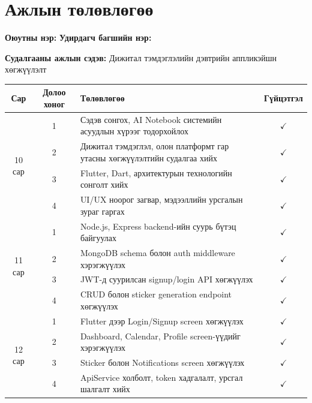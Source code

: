 \chapter*{Ажлын төлөвлөгөө}
\label{ch:plan}

\noindent\textbf{Оюутны нэр:} \authorShort \hfill \textbf{Удирдагч багшийн нэр:} \supervisorname

\noindent\textbf{Судалгааны ажлын сэдэв:} Дижитал тэмдэглэлийн дэвтрийн аппликэйшн хөгжүүлэлт

\vspace{0.3cm}

\begin{table}[H]
\centering
\small
\setlength{\tabcolsep}{4pt}
\renewcommand{\arraystretch}{1.0}

\begin{tabular}{|c|c|p{8.4cm}|c|}
\hline
\textbf{Сар} & \textbf{Долоо хоног} & \textbf{Төлөвлөгөө} & \textbf{Гүйцэтгэл} \\
\hline

\multirow{4}{*}{10 сар}
& 1 & Сэдэв сонгох, AI Notebook системийн асуудлын хүрээг тодорхойлох & $\checkmark$ \\
\cline{2-4}
& 2 & Дижитал тэмдэглэл, олон платформт гар утасны хөгжүүлэлтийн судалгаа хийх & $\checkmark$ \\
\cline{2-4}
& 3 & Flutter, Dart, архитектурын технологийн сонголт хийх & $\checkmark$ \\
\cline{2-4}
& 4 & UI/UX ноорог загвар, мэдээллийн урсгалын зураг гаргах & $\checkmark$ \\
\hline

\multirow{4}{*}{11 сар}
& 1 & Node.js, Express backend-ийн суурь бүтэц байгуулах & $\checkmark$ \\
\cline{2-4}
& 2 & MongoDB schema болон auth middleware хэрэгжүүлэх & $\checkmark$ \\
\cline{2-4}
& 3 & JWT-д суурилсан signup/login API хөгжүүлэх & $\checkmark$ \\
\cline{2-4}
& 4 & CRUD болон sticker generation endpoint хөгжүүлэх & $\checkmark$ \\
\hline

\multirow{4}{*}{12 сар}
& 1 & Flutter дээр Login/Signup screen хөгжүүлэх & $\checkmark$ \\
\cline{2-4}
& 2 & Dashboard, Calendar, Profile screen-үүдийг хэрэгжүүлэх & $\checkmark$ \\
\cline{2-4}
& 3 & Sticker болон Notifications screen хөгжүүлэх & $\checkmark$ \\
\cline{2-4}
& 4 & ApiService холболт, token хадгалалт, урсгал шалгалт хийх & $\checkmark$ \\
\hline


\end{tabular}
\end{table}
